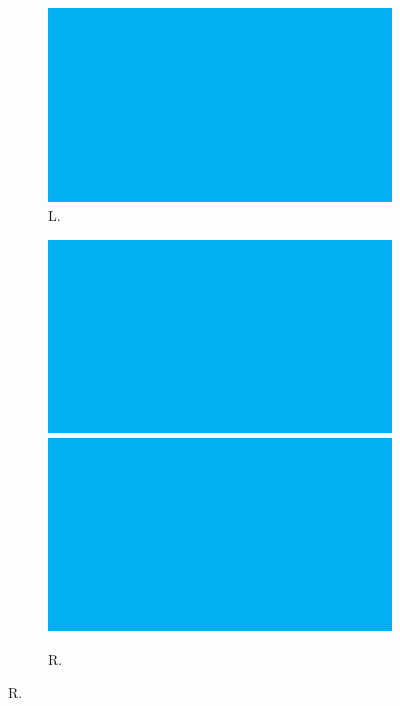 \begin{figure}[h!]
\begin{subfigure}[b]{0.24\columnwidth}
    \includegraphics[width=1\textwidth]{fig/fig1.pdf}
    \caption{L.}
    \label{fig:grid-middle-left}
  \end{subfigure}
  \begin{subfigure}[b]{0.24\columnwidth}
    \centering
    \includegraphics[width=1\textwidth]{fig/fig1.pdf}\\
    \includegraphics[width=1\textwidth]{fig/fig1.pdf}
    \caption{R.}
    \label{fig:grid-middle-right}

\end{subfigure}
\end{figure}

